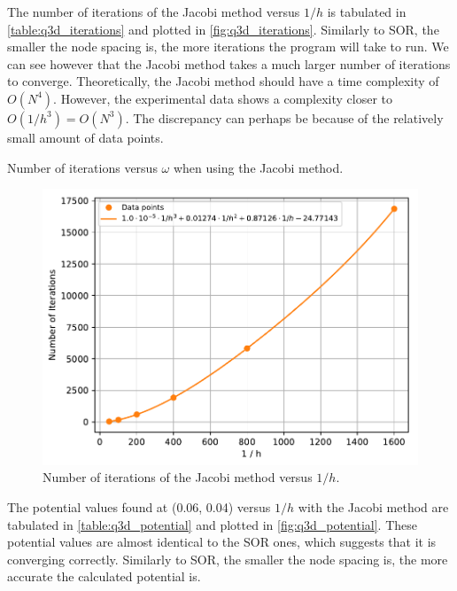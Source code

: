 \documentclass[a4paper,titlepage]{article}
\begin{document}
	The number of iterations of the Jacobi method versus $1/h$ is tabulated in \autoref{table:q3d_iterations} and plotted in \autoref{fig:q3d_iterations}. Similarly to SOR, the smaller the node spacing is, the more iterations the program will take to run. We can see however that the Jacobi method takes a much larger number of iterations to converge. Theoretically, the Jacobi method should have a time complexity of $O(N^4)$. However, the experimental data shows a complexity closer to $O(1/h^3) = O(N^3)$. The discrepancy can perhaps be because of the relatively small amount of data points.
	
	\begin{table}[!htb]
		\centering
		\caption{Number of iterations versus $\omega$ when using the Jacobi method.}
		\label{table:q3d_iterations}
	\end{table}

	\begin{figure}[!htb]
		\centering
		\includegraphics[width=\columnwidth]{plots/q3d_iterations.pdf}
		\caption
		{Number of iterations of the Jacobi method versus $1/h$.}
		\label{fig:q3d_iterations}
	\end{figure}

	The potential values found at (0.06, 0.04) versus $1/h$ with the Jacobi method are tabulated in \autoref{table:q3d_potential} and plotted in \autoref{fig:q3d_potential}. These potential values are almost identical to the SOR ones, which suggests that it is converging correctly. Similarly to SOR, the smaller the node spacing is, the more accurate the calculated potential is.
\end{document}
